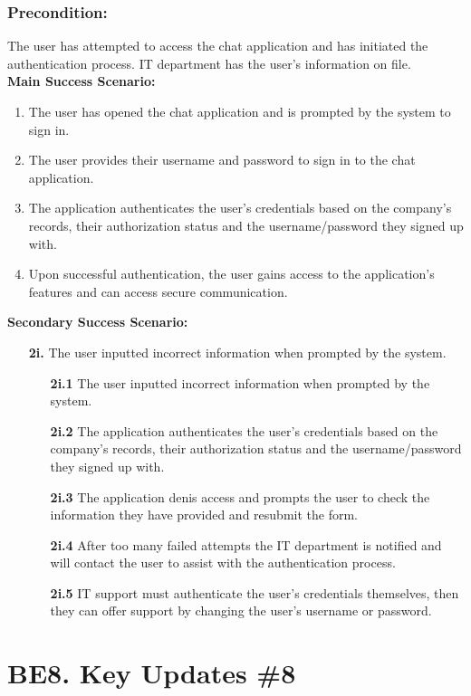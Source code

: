 \documentclass[]{article}
\begin{document}
\subsubsection*{Precondition:} The user has attempted to access the chat application and has initiated the authentication process. IT department has the user's information on file.\\
\textbf{Main Success Scenario:}
\begin{enumerate}
	\item The user has opened the chat application and is prompted by the system to sign in.
	\item The user provides their username and password to sign in to the chat application.
	\item The application authenticates the user's credentials based on the company's records, their authorization status and the username/password they signed up with.
	\item Upon successful authentication, the user gains access to the application's features and can access secure communication.
\end{enumerate}
\textbf{Secondary Success Scenario:}
\begin{enumerate}
	\item[\textbf{2i.}] The user inputted incorrect information when prompted by the system.
		\begin{enumerate}
			\item[\textbf{2i.1}] The user inputted incorrect information when prompted by the system.
			\item[\textbf{2i.2}] The application authenticates the user's credentials based on the company's records, their authorization status and the username/password they signed up with.
			\item[\textbf{2i.3}] The application denis access and prompts the user to check the information they have provided and resubmit the form.
			\item[\textbf{2i.4}] After too many failed attempts the IT department is notified and will contact the user to assist with the authentication process.
			\item[\textbf{2i.5}] IT support must authenticate the user's credentials themselves, then they can offer support by changing the user's username or password.
		\end{enumerate}
\end{enumerate}

\section*{BE8. Key Updates \#8}
\end{document}
